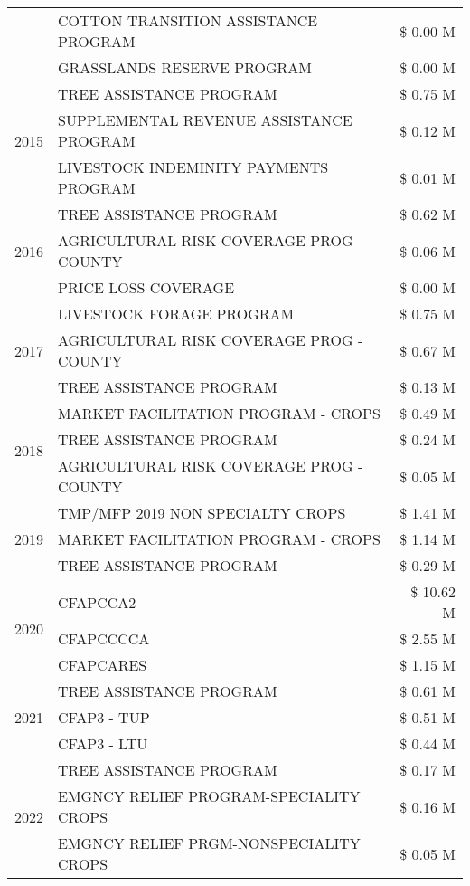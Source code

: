 \begin{tabular}{llr}
 & COTTON TRANSITION ASSISTANCE PROGRAM & \$ 0.00 M \\
 & GRASSLANDS RESERVE PROGRAM & \$ 0.00 M \\
\cline{1-3}
\multirow[t]{3}{*}{2015} & TREE ASSISTANCE PROGRAM & \$ 0.75 M \\
 & SUPPLEMENTAL REVENUE ASSISTANCE PROGRAM & \$ 0.12 M \\
 & LIVESTOCK INDEMINITY PAYMENTS PROGRAM & \$ 0.01 M \\
\cline{1-3}
\multirow[t]{3}{*}{2016} & TREE ASSISTANCE PROGRAM & \$ 0.62 M \\
 & AGRICULTURAL RISK COVERAGE PROG - COUNTY & \$ 0.06 M \\
 & PRICE LOSS COVERAGE & \$ 0.00 M \\
\cline{1-3}
\multirow[t]{3}{*}{2017} & LIVESTOCK FORAGE PROGRAM & \$ 0.75 M \\
 & AGRICULTURAL RISK COVERAGE PROG - COUNTY & \$ 0.67 M \\
 & TREE ASSISTANCE PROGRAM & \$ 0.13 M \\
\cline{1-3}
\multirow[t]{3}{*}{2018} & MARKET FACILITATION PROGRAM - CROPS & \$ 0.49 M \\
 & TREE ASSISTANCE PROGRAM & \$ 0.24 M \\
 & AGRICULTURAL RISK COVERAGE PROG - COUNTY & \$ 0.05 M \\
\cline{1-3}
\multirow[t]{3}{*}{2019} & TMP/MFP 2019 NON SPECIALTY CROPS & \$ 1.41 M \\
 & MARKET FACILITATION PROGRAM - CROPS & \$ 1.14 M \\
 & TREE ASSISTANCE PROGRAM & \$ 0.29 M \\
\cline{1-3}
\multirow[t]{3}{*}{2020} & CFAPCCA2 & \$ 10.62 M \\
 & CFAPCCCCA & \$ 2.55 M \\
 & CFAPCARES & \$ 1.15 M \\
\cline{1-3}
\multirow[t]{3}{*}{2021} & TREE ASSISTANCE PROGRAM & \$ 0.61 M \\
 & CFAP3 - TUP & \$ 0.51 M \\
 & CFAP3 - LTU & \$ 0.44 M \\
\cline{1-3}
\multirow[t]{3}{*}{2022} & TREE ASSISTANCE PROGRAM & \$ 0.17 M \\
 & EMGNCY RELIEF PROGRAM-SPECIALITY CROPS & \$ 0.16 M \\
 & EMGNCY RELIEF PRGM-NONSPECIALITY CROPS & \$ 0.05 M \\
\cline{1-3}
\bottomrule
\end{tabular}
